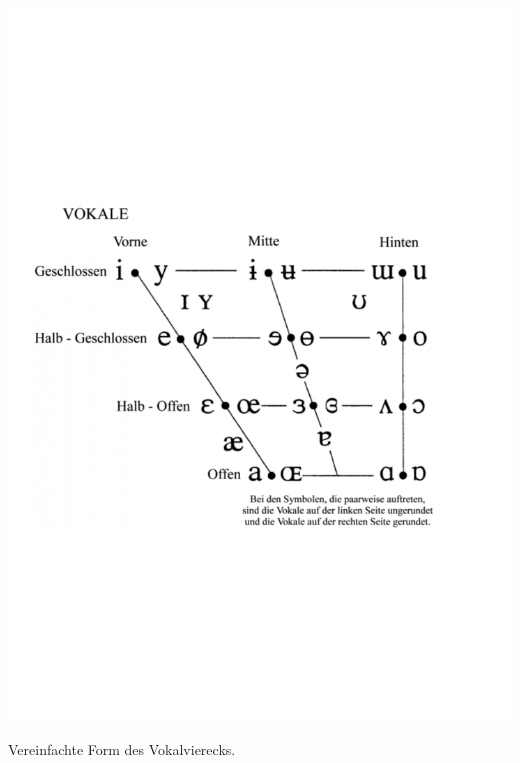 \documentclass[
  letterpaper,
]{scrbook}
\begin{document}
\includegraphics[width=1\textwidth,height=\textheight]{./pictures/02d_vokaltrapez_page-0001.jpg}

Vereinfachte Form des Vokalvierecks.
\end{document}
